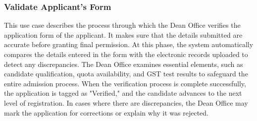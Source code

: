 \subsubsection{Validate Applicant’s Form}

This use case describes the process through which the Dean Office verifies the application form of the applicant.
It makes sure that the details submitted are accurate before granting final permission.
At this phase, the system automatically compares the details entered in the form 
with the electronic records uploaded to detect any discrepancies. The Dean Office examines essential elements, such as 
candidate qualification, quota availability, and GST test results to safeguard the entire admission process. When the verification 
process is complete successfully, the application is tagged as "Verified," and the candidate advances to the next level of 
registration. In cases where there are discrepancies, the Dean Office may mark the application for corrections or explain why it was rejected.


